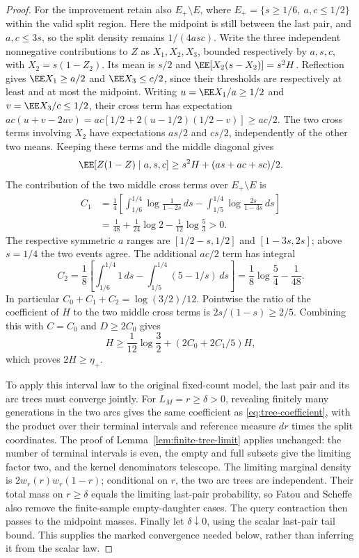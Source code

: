 \documentclass[11pt,letterpaper]{article}
\begin{document}
\begin{proof}
For the improvement retain also
$E_+\setminus E$, where $E_+=\{s\ge1/6,\ a,c\le1/2\}$
within the valid split region. Here the midpoint is still between the
last pair, and $a,c\le3s$, so the split density remains $1/(4asc)$.
Write the three independent nonnegative contributions to $Z$ as
$X_1,X_2,X_3$, bounded respectively by $a,s,c$, with
$X_2=s(1-Z_2)$. Its mean is $s/2$ and
$\EE[X_2(s-X_2)]=s^2H$.
Reflection gives $\EE X_1\ge a/2$ and $\EE X_3\le c/2$, since
their thresholds are respectively at least and at most the midpoint.
Writing $u=\EE X_1/a\ge1/2$ and $v=\EE X_3/c\le1/2$, their
cross term has expectation
$ac(u+v-2uv)=ac[1/2+2(u-1/2)(1/2-v)]\ge ac/2$.
The two cross terms involving $X_2$ have expectations $as/2$ and
$cs/2$, independently of the other two means. Keeping these terms
and the middle diagonal gives
\[
 \EE[Z(1-Z)\mid a,s,c]\ge s^2H+(as+ac+sc)/2.
\]
The contribution of the two middle cross terms over $E_+\setminus E$ is
\begin{align*}
 C_1
 &=\frac14\left[
   \int_{1/6}^{1/4}\log\frac1{1-2s}\,ds
   -\int_{1/5}^{1/4}\log\frac{2s}{1-3s}\,ds\right]\\
 &=\frac1{48}+\frac1{24}\log2-\frac1{12}\log\frac53>0.
\end{align*}
The respective symmetric $a$ ranges are $[1/2-s,1/2]$ and
$[1-3s,2s]$; above $s=1/4$ the two events agree.
The additional $ac/2$ term has integral
\[
 C_2=\frac18\left[\int_{1/6}^{1/4}1\,ds
                 -\int_{1/5}^{1/4}(5-1/s)\,ds\right]
     =\frac18\log\frac54-\frac1{48}.
\]
In particular $C_0+C_1+C_2=\log(3/2)/12$.
Pointwise the ratio of the coefficient of $H$ to the two middle
cross terms is $2s/(1-s)\ge2/5$. Combining this with
$C=C_0$ and $D\ge2C_0$ gives
\[
 H\ge\frac1{12}\log\frac32+(2C_0+2C_1/5)H,
\]
which proves $2H\ge\eta_+$.

To apply this interval law to the original fixed-count model, the last
pair and its arc trees must converge jointly. For $L_M=r\ge\delta>0$,
revealing finitely many generations in the two arcs gives the same
coefficient as \eqref{eq:tree-coefficient}, with the product over their
terminal intervals and reference measure $dr$ times the split coordinates.
The proof of Lemma~\ref{lem:finite-tree-limit} applies unchanged: the
number of terminal intervals is even, the empty and full subsets give
the limiting factor two, and the kernel denominators telescope.
The limiting marginal density is $2w_r(r)w_r(1-r)$; conditional on $r$,
the two arc trees are independent. Their total mass on $r\ge\delta$
equals the limiting last-pair probability, so Fatou and Scheffe also
remove the finite-sample empty-daughter cases. The query contraction
then passes to the midpoint masses. Finally let $\delta\downarrow0$,
using the scalar last-pair tail bound. This supplies the marked
convergence needed below, rather than inferring it from the scalar law.


\end{proof}
\end{document}
